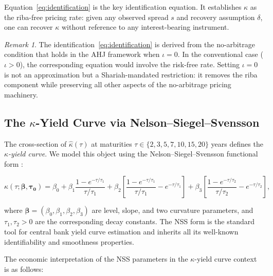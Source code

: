 \documentclass[12pt]{article}
\theoremstyle{plain}
\theoremstyle{definition}
\theoremstyle{remark}
\newtheorem{remark}{Remark}[section]
\begin{document}
Equation~\eqref{eq:identification} is the key identification equation. It
establishes $\kappa$ as the riba-free pricing rate: given any observed spread
$s$ and recovery assumption $\delta$, one can recover $\kappa$ without
reference to any interest-bearing instrument.

\begin{remark}
The identification~\eqref{eq:identification} is derived from the no-arbitrage
condition that holds in the AHJ framework when $\iota = 0$. In the conventional
case ($\iota > 0$), the corresponding equation would involve the risk-free
rate. Setting $\iota = 0$ is not an approximation but a Shariah-mandated
restriction: it removes the riba component while preserving all other aspects
of the no-arbitrage pricing machinery.
\end{remark}

\subsection{The \texorpdfstring{$\kappa$}{kappa}-Yield Curve via
Nelson--Siegel--Svensson}

The cross-section of $\hat{\kappa}(\tau)$ at maturities
$\tau \in \{2, 3, 5, 7, 10, 15, 20\}$ years defines the
\emph{$\kappa$-yield curve}. We model this object using the
Nelson--Siegel--Svensson functional form \citep{NelsonSiegel1987,Svensson1994}:

\begin{equation}
  \kappa(\tau;\boldsymbol{\beta},\boldsymbol{\tau_0}) =
    \beta_0
    + \beta_1 \frac{1 - e^{-\tau/\tau_1}}{\tau/\tau_1}
    + \beta_2 \left[\frac{1 - e^{-\tau/\tau_1}}{\tau/\tau_1}
                      - e^{-\tau/\tau_1}\right]
    + \beta_3 \left[\frac{1 - e^{-\tau/\tau_2}}{\tau/\tau_2}
                      - e^{-\tau/\tau_2}\right],
  \label{eq:nss}
\end{equation}

where $\boldsymbol{\beta} = (\beta_0, \beta_1, \beta_2, \beta_3)$ are level,
slope, and two curvature parameters, and $\tau_1, \tau_2 > 0$ are the
corresponding decay constants. The NSS form is the standard tool for central
bank yield curve estimation \citep{BIS2022} and inherits all its well-known
identifiability and smoothness properties.

The economic interpretation of the NSS parameters in the $\kappa$-yield curve
context is as follows:
\end{document}
